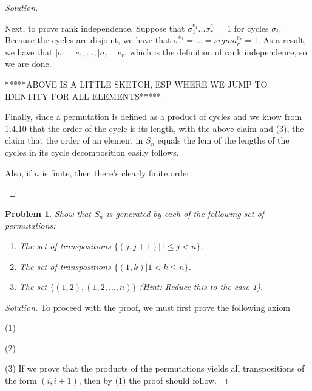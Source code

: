 \documentclass[11 pt]{article}
\newtheorem{Prob}{Problem}
\theoremstyle{definition}
\theoremstyle{remark}
\newenvironment{solution}
  {\renewcommand\qedsymbol{$\blacksquare$}\begin{proof}[Solution]}
  {\end{proof}}
\begin{document}
\begin{solution}
\begin{enumerate}
Next, to prove rank independence. Suppose that $\sigma_1^{e_1}...\sigma_r^{e_r} = 1$ for cycles $\sigma_i$. Because the cycles are disjoint, we have that $\sigma_1^{e_1} = ... = sigma_r^{e_r} = 1$. As a result, we have that $|\sigma_1| \mid e_1,...,|\sigma_r| \mid e_r$, which is the definition of rank independence, so we are done.

*****ABOVE IS A LITTLE SKETCH, ESP WHERE WE JUMP TO IDENTITY FOR ALL ELEMENTS*****

Finally, since a permutation is defined as a product of cycles and we know from 1.4.10 that the order of the cycle is its length, with the above claim and (3), the claim that the order of an element in $S_n$ equals the lcm of the lengths of the cycles in its cycle decomposition easily follows.

Also, if $n$ is finite, then there's clearly finite order.
\end{enumerate}
\end{solution}

\begin{Prob}
	Show that $S_n$ is generated by each of the following set of permutations:
	\begin{enumerate}
		\item The set of transpositions $\{(j, j+1)|1\leq j<n\}$.
		\item The set of transpositions $\{(1,k)|1<k\leq n\}$.
		\item The set $\{(1,2),(1,2,\dots,n)\}$ (Hint: Reduce this to the case 1).
	\end{enumerate}
\end{Prob}

\begin{solution}
To proceed with the proof, we must first prove the following axiom

(1) 

(2)

(3) If we prove that the products of the permutations yields all transpositions of the form $(i,i+1)$, then by (1) the proof should follow.
\end{solution}

\end{document}
